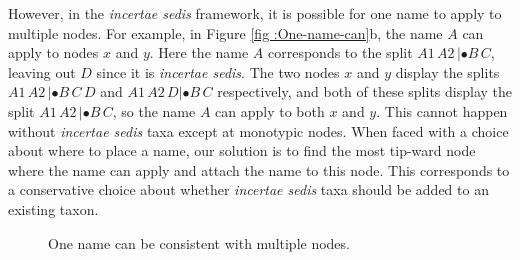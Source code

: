 \documentclass[english]{article}
\begin{document}
However, in the \emph{incertae sedis} framework, it is possible for
one name to apply to multiple nodes. For example, in Figure \ref{fig
:One-name-can}b, the name $A$ can apply to nodes $x$ and $y$. Here the
name $A$ corresponds to the split $A1\,A2\,|\bullet B\,C$, leaving out
$D$ since it is \emph{incertae sedis}. The two nodes $x$ and $y$
display the splits $A1\,A2\,|\bullet B\,C\,D$ and $A1\,A2\,D|\bullet
B\,C$ respectively, and both of these splits display the split
$A1\,A2\,|\bullet B\,C$, so the name $A$ can apply to both $x$ and
$y$. This cannot happen without\emph{ incertae sedis} taxa except at
monotypic nodes. When faced with a choice about where to place a name,
our solution is to find the most tip-ward node where the name can
apply and attach the name to this node. This corresponds to a
conservative choice about whether \emph{incertae sedis} taxa should be
added to an existing taxon.
\begin{figure}
\hfill{}
\hfill{}
\hfill{}
\caption{\label{fig:One-name-can}One name can be consistent with multiple nodes.}
\end{figure}
\end{document}
